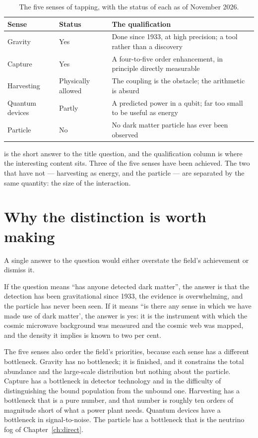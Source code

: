 \begin{table}[H]
\centering
\caption{The five senses of tapping, with the status of each as of November
2026.}
\label{tab:senses}
\begin{tabular}{@{}>{\RaggedRight\arraybackslash}p{}p{}p{}@{}}
\toprule
\textbf{Sense} & \textbf{Status} & \textbf{The qualification} \\
\midrule
Gravity & Yes & Done since 1933, at high precision; a tool rather than a discovery \\
Capture & Yes & A four-to-five order enhancement, in principle directly measurable \\
Harvesting & Physically allowed & The coupling is the obstacle; the arithmetic is absurd \\
Quantum devices & Partly & A predicted power in a qubit; far too small to be useful as energy \\
Particle & No & No dark matter particle has ever been observed \\
\bottomrule
\end{tabular}
\end{table}

 is the short answer to the title question, and the
qualification column is where the interesting content sits. Three of the
five senses have been achieved. The two that have not --- harvesting as
energy, and the particle --- are separated by the same quantity: the size of
the interaction.

\section{Why the distinction is worth making}A single answer to the question
would either overstate the field's achievement or dismiss it.

If the question means ``has anyone detected dark matter'', the answer is
that the detection has been gravitational since 1933, the evidence is
overwhelming, and the particle has never been seen. If it means ``is there
any sense in which we have made use of dark matter', the answer is yes: it
is the instrument with which the cosmic microwave background was measured
and the cosmic web was mapped, and the density it implies is known to two
per cent.

The five senses also order the field's priorities, because each sense has a
different bottleneck. Gravity has no bottleneck; it is finished, and it
constrains the total abundance and the large-scale distribution but nothing
about the particle. Capture has a bottleneck in detector technology and in
the difficulty of distinguishing the bound population from the unbound one.
Harvesting has a bottleneck that is a pure number, and that number is
roughly ten orders of magnitude short of what a power plant needs.
Quantum devices have a bottleneck in signal-to-noise. The particle has a
bottleneck that is the neutrino fog of Chapter~\ref{ch:direct}.

